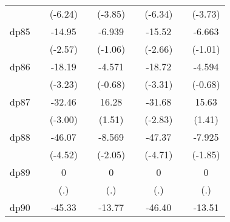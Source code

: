 {\begin{tabular}{l*{8}{c}}
            &                     &     (-6.24)         &                     &     (-3.85)         &                     &     (-6.34)         &                     &     (-3.73)         \\
[1em]
dp85        &                     &      -14.95\sym{*}  &                     &      -6.939         &                     &      -15.52\sym{**} &                     &      -6.663         \\
            &                     &     (-2.57)         &                     &     (-1.06)         &                     &     (-2.66)         &                     &     (-1.01)         \\
[1em]
dp86        &                     &      -18.19\sym{**} &                     &      -4.571         &                     &      -18.72\sym{***}&                     &      -4.594         \\
            &                     &     (-3.23)         &                     &     (-0.68)         &                     &     (-3.31)         &                     &     (-0.68)         \\
[1em]
dp87        &                     &      -32.46\sym{**} &                     &       16.28         &                     &      -31.68\sym{**} &                     &       15.63         \\
            &                     &     (-3.00)         &                     &      (1.51)         &                     &     (-2.83)         &                     &      (1.41)         \\
[1em]
dp88        &                     &      -46.07\sym{***}&                     &      -8.569\sym{*}  &                     &      -47.37\sym{***}&                     &      -7.925         \\
            &                     &     (-4.52)         &                     &     (-2.05)         &                     &     (-4.71)         &                     &     (-1.85)         \\
[1em]
dp89        &                     &           0         &                     &           0         &                     &           0         &                     &           0         \\
            &                     &         (.)         &                     &         (.)         &                     &         (.)         &                     &         (.)         \\
[1em]
dp90        &                     &      -45.33\sym{***}&                     &      -13.77\sym{**} &                     &      -46.40\sym{***}&                     &      -13.51\sym{**} \\

\end{tabular}}
